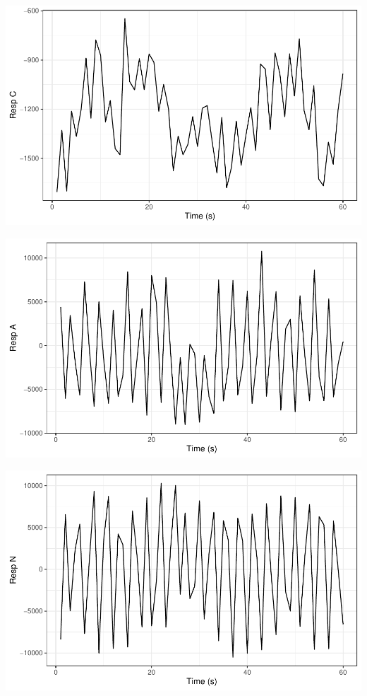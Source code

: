 \documentclass[
]{article}
\begin{document}
\begin{center}\includegraphics{report_files/figure-latex/resp-3} \end{center}

\begin{center}\includegraphics{report_files/figure-latex/resp-4} \end{center}

\begin{center}\includegraphics{report_files/figure-latex/resp-5} \end{center}
\end{document}
